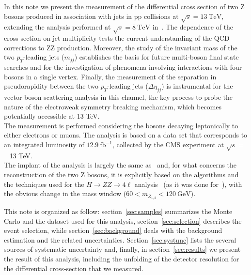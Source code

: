 In this note we present the measurement of the differential cross section of two Z bosons produced in association with jets in pp collisions at $\sqrt{s}= 13~\mathrm{TeV}$, extending the analysis performed at $\sqrt{s}= 8~\mathrm{TeV}$ in~\cite{CMS-PAS-SMP-15-012}. The dependence of the cross section on jet multiplicity tests the current understanding of the QCD corrections to ZZ production. Moreover, the study of the invariant mass of the two $p_T$-leading jets ($m_{jj}$) establishes the basis for future multi-boson final state searches and for the investigation of phenomena involving interactions with four bosons in a single vertex. Finally, the measurement of the separation in pseudorapidity between the two $p_T$-leading jets ($\Delta\eta_{jj}$) is instrumental for the vector boson scattering analysis in this channel, the key process to probe the nature of the electroweak symmetry breaking mechanism, which becomes potentially accessible at 13 TeV.\\
 The measurement is performed considering the \Z bosons decaying leptonically to either electrons or muons. The analysis is based on a data set that corresponds to an integrated luminosity of $12.9~\mathrm{fb}^{-1}$, collected by the CMS experiment at $\sqrt{s} =$~ 13 TeV.\\

The implant of the analysis is largely the same as~\cite{CMS-PAS-SMP-15-012} and, for what concerns the reconstruction of the two Z bosons, it is explicitly
based on the algorithms and the techniques used for the $H\rightarrow ZZ \rightarrow 4\ell$ analysis~\cite{HiggsLegacyPaper} (as it was done for~\cite{CMS-PAS-SMP-15-012}), with the obvious change in the mass window ($60 < m_{Z_{1,2}} < 120~\mathrm{GeV}$). %


This note is organized as follow: section~\ref{sec:samples} summarizes the Monte Carlo and the dataset used for this analysis, section~\ref{sec:selection} describes the event selection, 
while section~\ref{sec:background} deals with the background estimation and the related uncertainties. Section~\ref{sec:systunc} lists the several sources of systematic uncertainty and, finally, in section~\ref{sec:results} we present the result of this analysis,
including the unfolding of the detector resolution for the differential cross-section that we measured.
 
